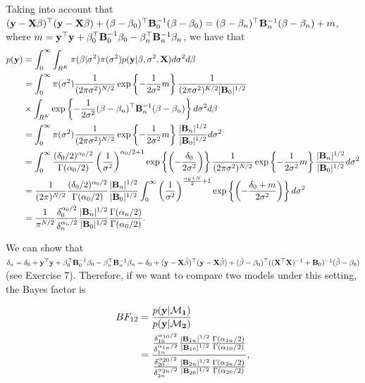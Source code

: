 Taking into account that $({\bf{y}}-{\bf{X}}\beta)^{\top}({\bf{y}}-{\bf{X}}\beta)+(\beta-\beta_0)^{\top}{\bf{B}}_0^{-1}(\beta-\beta_0)=(\beta-\beta_n)^{\top}{\bf{B}}_n^{-1}(\beta-\beta_n)+m$, where $m={\bf{y}}^{\top}{\bf{y}}+\beta_0^{\top}{\bf{B}}_0^{-1}\beta_0-\beta_n^{\top}{\bf{B}}_n^{-1}\beta_n$, we have that
{\footnotesize{
\begin{align*}
	p({\bf{y}})&=\int_0^{\infty}\int_{R^K}\pi (\beta | \sigma^2)\pi(\sigma^2)p({\bf{y}}|\beta, \sigma^2, {\bf{X}})d\sigma^2 d\beta\\
	&=\int_0^{\infty}\pi(\sigma^2) \frac{1}{(2\pi\sigma^2)^{N/2}}\exp\left\{-\frac{1}{2\sigma^2}m \right\}   \frac{1}{(2\pi\sigma^2)^{K/2}|{\bf{B}}_0|^{1/2}}\\
	&\times\int_{R^K}\exp\left\{-\frac{1}{2\sigma^2}(\beta-\beta_n)^{\top}{\bf{B}}_n^{-1}(\beta-\beta_n)\right\}d\sigma^2 d\beta\\
	&=\int_0^{\infty}\pi(\sigma^2) \frac{1}{(2\pi\sigma^2)^{N/2}}\exp\left\{-\frac{1}{2\sigma^2}m \right\}   \frac{|{\bf{B}}_n|^{1/2}}{|{\bf{B}}_0|^{1/2}}d\sigma^2\\
	&=\int_{0}^{\infty} \frac{(\delta_0/2)^{\alpha_0/2}}{\Gamma(\alpha_0/2)}\left(\frac{1}{\sigma^2}\right)^{\alpha_0/2+1}\exp\left\{\left(-\frac{\delta_0}{2\sigma^2}\right)\right\} \frac{1}{(2\pi\sigma^2)^{N/2}}\exp\left\{-\frac{1}{2\sigma^2}m \right\}   \frac{|{\bf{B}}_n|^{1/2}}{|{\bf{B}}_0|^{1/2}} d\sigma^2\\
	&= \frac{1}{(2\pi)^{N/2}}\frac{(\delta_0/2)^{\alpha_0/2}}{\Gamma(\alpha_0/2)}\frac{|{\bf{B}}_n|^{1/2}}{|{\bf{B}}_0|^{1/2}}\int_{0}^{\infty}\left(\frac{1}{\sigma^2}\right)^{\frac{\alpha_0+N}{2}+1}\exp\left\{\left(-\frac{\delta_0+m}{2\sigma^2}\right)\right\}d\sigma^2\\
	&= \frac{1}{\pi^{N/2}}\frac{\delta_0^{\alpha_0/2}}{\delta_n^{\alpha_n/2}}\frac{|{\bf{B}}_n|^{1/2}}{|{\bf{B}}_0|^{1/2}}\frac{\Gamma(\alpha_n/2)}{\Gamma(\alpha_0/2)}.
\end{align*}
}}

We can show that $\delta_n=\delta_0 + {\bf{y}}^{\top}{\bf{y}} + \beta_0^{\top}{\bf{B}}_0^{-1}\beta_0 - \beta_n^{\top}{\bf{B}}_n^{-1}\beta_n=\delta_0+({\bf{y}}-{\bf{X}}\hat{\beta})^{\top}({\bf{y}}-{\bf{X}}\hat{\beta})+(\hat{\beta}-\beta_0)^{\top}(({\bf{X}}^{\top}{\bf{X}})^{-1}+{\bf{B}}_0)^{-1}(\hat{\beta}-\beta_0)$ (see Exercise 7). Therefore, if we want to compare two models under this setting, the Bayes factor is

\begin{align*}
	BF_{12}&=\frac{p(\bf{y}|\mathcal{M}_1)}{p(\bf{y}|\mathcal{M}_2)}\\
	&=\frac{\frac{\delta_{10}^{\alpha_{10}/2}}{\delta_{1n}^{\alpha_{1n}/2}}\frac{|{\bf{B}}_{1n}|^{1/2}}{|{\bf{B}}_{10}|^{1/2}}\frac{\Gamma(\alpha_{1n}/2)}{\Gamma(\alpha_{10}/2)}}{\frac{\delta_{20}^{\alpha_{20}/2}}{\delta_{2n}^{\alpha_{2n}/2}}\frac{|{\bf{B}}_{2n}|^{1/2}}{|{\bf{B}}_{20}|^{1/2}}\frac{\Gamma(\alpha_{2n}/2)}{\Gamma(\alpha_{20}/2)}},
\end{align*}


